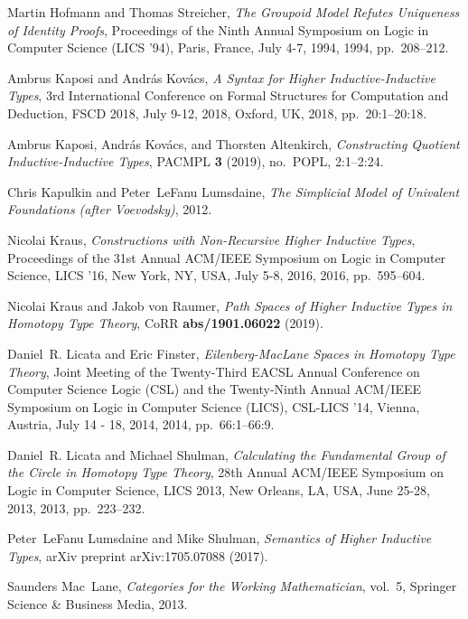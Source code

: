 \documentclass[9pt]{entcs}
\newcommand{\0}{\textbf{0}} %
\begin{document}
\begin{thebibliography}{10}
	Martin Hofmann and Thomas Streicher, \emph{{The Groupoid Model Refutes
			Uniqueness of Identity Proofs}}, Proceedings of the Ninth Annual Symposium on
	Logic in Computer Science {(LICS} '94), Paris, France, July 4-7, 1994, 1994,
	pp.~208--212.
	
	Ambrus Kaposi and Andr{\'{a}}s Kov{\'{a}}cs, \emph{{A Syntax for Higher
			Inductive-Inductive Types}}, 3rd International Conference on Formal
	Structures for Computation and Deduction, {FSCD} 2018, July 9-12, 2018,
	Oxford, {UK}, 2018, pp.~20:1--20:18.
	
	Ambrus Kaposi, Andr{\'{a}}s Kov{\'{a}}cs, and Thorsten Altenkirch,
	\emph{{Constructing Quotient Inductive-Inductive Types}}, {PACMPL} \textbf{3}
	(2019), no.~{POPL}, 2:1--2:24.
	
	Chris Kapulkin and Peter~LeFanu Lumsdaine, \emph{{The Simplicial Model of
			Univalent Foundations (after Voevodsky)}}, 2012.
	
	Nicolai Kraus, \emph{{Constructions with Non-Recursive Higher Inductive
			Types}}, Proceedings of the 31st Annual {ACM/IEEE} Symposium on Logic in
	Computer Science, {LICS} '16, New York, NY, USA, July 5-8, 2016, 2016,
	pp.~595--604.
	
	Nicolai Kraus and Jakob von Raumer, \emph{{Path Spaces of Higher Inductive
			Types in Homotopy Type Theory}}, CoRR \textbf{abs/1901.06022} (2019).
	
	Daniel~R. Licata and Eric Finster, \emph{{Eilenberg-MacLane Spaces in Homotopy
			Type Theory}}, Joint Meeting of the Twenty-Third {EACSL} Annual Conference on
	Computer Science Logic {(CSL)} and the Twenty-Ninth Annual {ACM/IEEE}
	Symposium on Logic in Computer Science (LICS), {CSL-LICS} '14, Vienna,
	Austria, July 14 - 18, 2014, 2014, pp.~66:1--66:9.
	
	Daniel~R. Licata and Michael Shulman, \emph{{Calculating the Fundamental Group
			of the Circle in Homotopy Type Theory}}, 28th Annual {ACM/IEEE} Symposium on
	Logic in Computer Science, {LICS} 2013, New Orleans, LA, USA, June 25-28,
	2013, 2013, pp.~223--232.
	
	Peter~LeFanu Lumsdaine and Mike Shulman, \emph{{Semantics of Higher Inductive
			Types}}, arXiv preprint arXiv:1705.07088 (2017).
	
	Saunders Mac~Lane, \emph{{Categories for the Working Mathematician}}, vol.~5,
	Springer Science \& Business Media, 2013.
	

\end{thebibliography}
\end{document}
